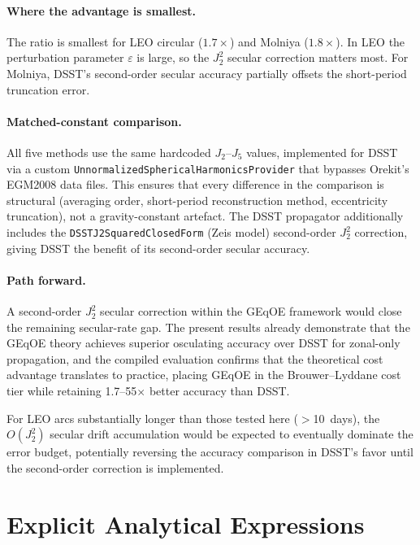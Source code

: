 \documentclass[11pt]{article}
\begin{document}
\paragraph{Where the advantage is smallest.}
The ratio is smallest for LEO circular ($1.7\times$) and Molniya
($1.8\times$). In LEO the perturbation parameter $\varepsilon$ is large,
so the $J_2^2$ secular correction matters most. For Molniya, DSST's
second-order secular accuracy partially offsets the short-period
truncation error.

\paragraph{Matched-constant comparison.}
All five methods use the same hardcoded $J_2$--$J_5$ values, implemented
for DSST via a custom \texttt{UnnormalizedSphericalHarmonicsProvider} that
bypasses Orekit's EGM2008 data files. This ensures that every difference in
the comparison is structural (averaging order, short-period reconstruction
method, eccentricity truncation), not a gravity-constant artefact.
The DSST propagator additionally includes the
\texttt{DSSTJ2SquaredClosedForm} (Zeis model) second-order $J_2^2$
correction, giving DSST the benefit of its second-order secular accuracy.

\paragraph{Path forward.}
A second-order $J_2^2$ secular correction within the GEqOE framework would
close the remaining secular-rate gap. The present results already demonstrate
that the GEqOE theory achieves superior osculating accuracy over DSST for
zonal-only propagation, and the compiled evaluation confirms that the
theoretical cost advantage translates to practice, placing GEqOE in the
Brouwer--Lyddane cost tier while retaining 1.7--55$\times$ better
accuracy than DSST.

For LEO arcs substantially longer than those tested here ($>$10~days), the
$O(J_2^2)$ secular drift accumulation would be expected to eventually
dominate the error budget, potentially reversing the accuracy comparison in
DSST's favor until the second-order correction is implemented.


\section{Explicit Analytical Expressions}
\label{sec:explicit_expressions}
\end{document}

